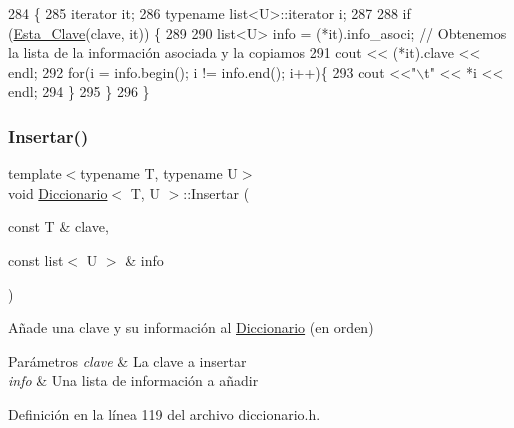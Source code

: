 \begin{DoxyCode}
284                                          \{
285         iterator it;
286         \textcolor{keyword}{typename} list<U>::iterator i;
287 
288         \textcolor{keywordflow}{if} (\hyperlink{classDiccionario_a16314351b0600835ade3c7add2ffe040}{Esta\_Clave}(clave, it)) \{
289 
290             list<U> info = (*it).info\_asoci;                                    \textcolor{comment}{// Obtenemos la lista de la
       información asociada y la copiamos}
291             cout << (*it).clave << endl;
292             \textcolor{keywordflow}{for}(i = info.begin(); i != info.end(); i++)\{
293                 cout <<\textcolor{stringliteral}{"\(\backslash\)t"} << *i << endl;
294             \}
295         \}
296     \}
\end{DoxyCode}
\mbox{\label{classDiccionario_af520b73907852cc8002260ddf9fb822c}} 
\subsubsection{\texorpdfstring{Insertar()}{Insertar()}}
{\footnotesize\ttfamily template$<$typename T, typename U$>$ \\
void \hyperlink{classDiccionario}{Diccionario}$<$ T, U $>$\+::Insertar (\begin{DoxyParamCaption}\item[{const T \&}]{clave,  }\item[{const list$<$ U $>$ \&}]{info }\end{DoxyParamCaption})\hspace{0.3cm}{\ttfamily [inline]}}



Añade una clave y su información al \hyperlink{classDiccionario}{Diccionario} (en orden) 


\begin{DoxyParams}{Parámetros}
{\em clave} & La clave a insertar \\
\hline
{\em info} & Una lista de información a añadir \\
\hline
\end{DoxyParams}


Definición en la línea 119 del archivo diccionario.\+h.



